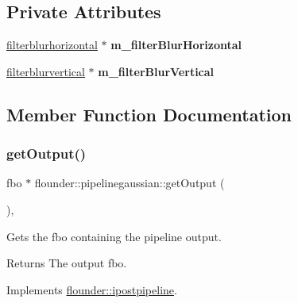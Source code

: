 \subsection*{Private Attributes}
\begin{DoxyCompactItemize}
\item 
\mbox{\label{classflounder_1_1pipelinegaussian_aaca52c35dffac3b900d75d8804b63edb}} 
\hyperlink{classflounder_1_1filterblurhorizontal}{filterblurhorizontal} $\ast$ {\bfseries m\+\_\+filter\+Blur\+Horizontal}
\item 
\mbox{\label{classflounder_1_1pipelinegaussian_a07b5554a4df22a6a2edc97660578a6a1}} 
\hyperlink{classflounder_1_1filterblurvertical}{filterblurvertical} $\ast$ {\bfseries m\+\_\+filter\+Blur\+Vertical}
\end{DoxyCompactItemize}


\subsection{Member Function Documentation}
\mbox{\label{classflounder_1_1pipelinegaussian_aae27c8214a8a544b1ab96ddd2383a2b2}} 
\subsubsection{\texorpdfstring{get\+Output()}{getOutput()}}
{\footnotesize\ttfamily fbo $\ast$ flounder\+::pipelinegaussian\+::get\+Output (\begin{DoxyParamCaption}{ }\end{DoxyParamCaption})\hspace{0.3cm}{\ttfamily [override]}, {\ttfamily [virtual]}}



Gets the fbo containing the pipeline output. 

\begin{DoxyReturn}{Returns}
The output fbo. 
\end{DoxyReturn}


Implements \hyperlink{classflounder_1_1ipostpipeline_a08f5d19b9652528337b73c2f4e0e4258}{flounder\+::ipostpipeline}.

